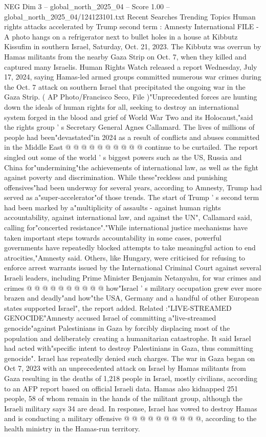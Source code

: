 \begin{textsample}{NEG Dim 3 – global\_north\_2025\_04 – Score 1.00 – global\_north\_2025\_04/124123101.txt}  \label{ex:f3_neg_418}
Recent Searches Trending Topics Human rights attacks accelerated by Trump second term : Amnesty International FILE - A photo hangs on a refrigerator next to bullet holes in a house at Kibbutz Kissufim in southern Israel, Saturday, Oct. 21, 2023.
The Kibbutz was overrun by Hamas militants from the nearby Gaza Strip on Oct. 7, when they killed and captured many Israelis.
Human Rights Watch released a report Wednesday, July 17, 2024, saying Hamas-led armed groups committed numerous war crimes during the Oct. 7 attack on southern Israel that precipitated the ongoing war in the Gaza Strip. ( AP Photo/Francisco Seco, File )"Unprecedented forces are hunting down the ideals of human rights for all, seeking to destroy an international system forged in the blood and grief of World War Two and its Holocaust,"said the rights group ' s Secretary General Agnes Callamard.
The lives of millions of people had been"devastated"in 2024 as a result of conflicts and abuses committed in the Middle East @ @ @ @ @ @ @ @ @ @ continue to be curtailed.
The report singled out some of the world ' s biggest powers such as the US, Russia and China for"undermining"the achievements of international law, as well as the fight against poverty and discrimination.
While these"reckless and punishing offensives"had been underway for several years, according to Amnesty, Trump had served as a"super-accelerator"of those trends.
The start of Trump ' s second term had been marked by a"multiplicity of assaults - against human rights accountability, against international law, and against the UN", Callamard said, calling for"concerted resistance"."While international justice mechanisms have taken important steps towards accountability in some cases, powerful governments have repeatedly blocked attempts to take meaningful action to end atrocities,"Amnesty said.
Others, like Hungary, were criticised for refusing to enforce arrest warrants issued by the International Criminal Court against several Israeli leaders, including Prime Minister Benjamin Netanyahu, for war crimes and crimes @ @ @ @ @ @ @ @ @ @ how"Israel ' s military occupation grew ever more brazen and deadly"and how"the USA, Germany and a handful of other European states supported Israel", the report added.
Related :"LIVE-STREAMED GENOCIDE"Amnesty accused Israel of committing a"live-streamed genocide"against Palestinians in Gaza by forcibly displacing most of the population and deliberately creating a humanitarian catastrophe.
It said Israel had acted with"specific intent to destroy Palestinians in Gaza, thus committing genocide".
Israel has repeatedly denied such charges.
The war in Gaza began on Oct 7, 2023 with an unprecedented attack on Israel by Hamas militants from Gaza resulting in the deaths of 1,218 people in Israel, mostly civilians, according to an AFP report based on official Israeli data.
Hamas also kidnapped 251 people, 58 of whom remain in the hands of the militant group, although the Israeli military says 34 are dead.
In response, Israel has vowed to destroy Hamas and is conducting a military offensive @ @ @ @ @ @ @ @ @ @, according to the health ministry in the Hamas-run territory.

\end{textsample}
